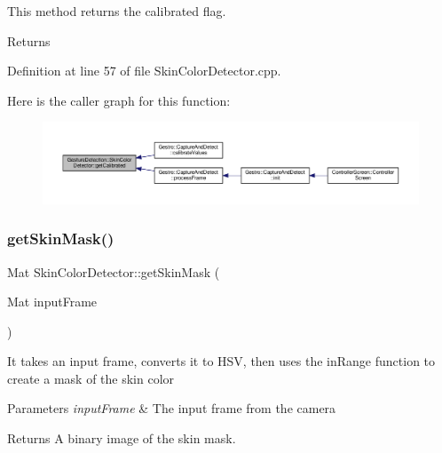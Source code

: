 This method returns the calibrated flag. \begin{DoxyReturn}{Returns}

\end{DoxyReturn}


Definition at line 57 of file Skin\+Color\+Detector.\+cpp.

Here is the caller graph for this function\+:
\nopagebreak
\begin{figure}[H]
\begin{center}
\leavevmode
\includegraphics[width=350pt]{class_gesture_detection_1_1_skin_color_detector_ad02c96fbc75934c86d22dd90ee726373_icgraph}
\end{center}
\end{figure}
\mbox{\label{class_gesture_detection_1_1_skin_color_detector_a8cf2f51c4c7797a126b767e48458a006}} 
\subsubsection{\texorpdfstring{get\+Skin\+Mask()}{getSkinMask()}}
{\footnotesize\ttfamily Mat Skin\+Color\+Detector\+::get\+Skin\+Mask (\begin{DoxyParamCaption}\item[{Mat}]{input\+Frame }\end{DoxyParamCaption})}

It takes an input frame, converts it to H\+SV, then uses the in\+Range function to create a mask of the skin color


\begin{DoxyParams}{Parameters}
{\em input\+Frame} & The input frame from the camera\\
\hline
\end{DoxyParams}
\begin{DoxyReturn}{Returns}
A binary image of the skin mask. 
\end{DoxyReturn}



